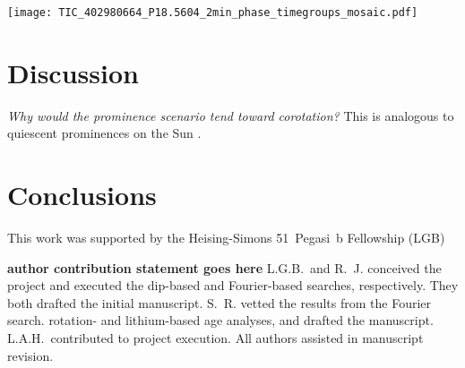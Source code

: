 \documentclass[11pt,twocolumn,tighten]{aastex63}
\begin{document}
\begin{figure*}[!t]
	\begin{center}
    \centering
    \texttt{[image: TIC\_402980664\_P18.5604\_2min\_phase\_timegroups\_mosaic.pdf]}
		\vspace{-0.45cm}
		\caption{
			{\it Bottom:}
      Evolution of LP 12-502 ($P$=18.6\,h) at fixed period over three
      years; small text denotes cycle number.  The TESS pointing law
      dictates time gaps; larger gaps tend to yield larger shape
      changes.
      The dips usually evolve over tens to hundreds of cycles.
      However cycles 1233-1264 show a dip that ``switched'' from a depth
      and duration of 3\% and 3\,hr to 0.3\% and 1\,hr over less than
      one cycle.
			\vspace{-0.8cm}
		}
		\label{fig:lp}
	\end{center}
\end{figure*}






\section{Discussion}
\label{sec:discussion}



{\it Why would the prominence scenario tend toward corotation?}
This is analogous to quiescent
prominences on the Sun \citep{1967SoPh....2...39K}.

\section{Conclusions}
\label{sec:conclusion}

\acknowledgments
This work was supported by the 
Heising-Simons 51~Pegasi~b Fellowship (LGB)

{\bf author contribution statement goes here}
L.G.B.~and R.~J. conceived the project and executed the
dip-based and Fourier-based searches, respectively.
They both drafted the initial manuscript.
S.~R. vetted the results from the Fourier search.
rotation- and lithium-based age analyses, and drafted the manuscript.
L.A.H.~contributed to project execution.
All authors assisted in manuscript revision.
\end{document}
